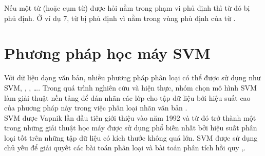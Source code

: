 
Nếu một từ (hoặc cụm từ) được hỏi nằm trong phạm vi phủ định thì từ đó bị phủ định. Ở ví dụ 7, từ  bị phủ định vì nằm trong vùng phủ định của từ .

\section{Phương pháp học máy SVM}
Với dữ liệu dạng văn bản, nhiều phương pháp phân loại có thể được sử dụng như SVM, , , \ldots \cite{manning2009anintroduction}. Trong quá trình nghiên cứu và hiện thực, nhóm chọn mô hình SVM làm giải thuật nền tảng để dán nhãn các lớp cho tập dữ liệu bởi hiệu suất cao của phương pháp này trong việc phân loại nhãn văn bản \cite{joachims1998text}.\\

SVM được Vapnik lần đầu tiên giới thiệu vào năm 1992 và từ đó trở thành một trong những giải thuật học máy được sử dụng phổ biến nhất bởi hiệu suất phân loại tốt trên những tập dữ liệu có kích thước không quá lớn. SVM được sử dụng chủ yếu để giải quyết các bài toán phân loại và bài toán phân tích hồi quy \cite{chandrakala2012opinion},\cite{manning2009anintroduction}. \\

